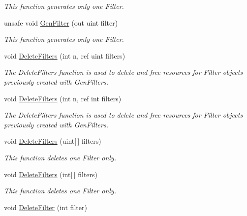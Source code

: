 \begin{DoxyCompactItemize}
\begin{DoxyCompactList}\small\item\em This function generates only one Filter.\end{DoxyCompactList}\item 
unsafe void \hyperlink{class_open_t_k_1_1_audio_1_1_open_a_l_1_1_effects_extension_a82b70f934c938398c417419b9982fe7b}{Gen\-Filter} (out uint filter)
\begin{DoxyCompactList}\small\item\em This function generates only one Filter.\end{DoxyCompactList}\item 
void \hyperlink{class_open_t_k_1_1_audio_1_1_open_a_l_1_1_effects_extension_ad4e48a24fe5c4f31895114bb04dd5d0b}{Delete\-Filters} (int n, ref uint filters)
\begin{DoxyCompactList}\small\item\em The Delete\-Filters function is used to delete and free resources for Filter objects previously created with Gen\-Filters.\end{DoxyCompactList}\item 
void \hyperlink{class_open_t_k_1_1_audio_1_1_open_a_l_1_1_effects_extension_a24505350970276bc214dfc089ca6b7d3}{Delete\-Filters} (int n, ref int filters)
\begin{DoxyCompactList}\small\item\em The Delete\-Filters function is used to delete and free resources for Filter objects previously created with Gen\-Filters.\end{DoxyCompactList}\item 
void \hyperlink{class_open_t_k_1_1_audio_1_1_open_a_l_1_1_effects_extension_a60a4a879c356dab286f6325dc2084729}{Delete\-Filters} (uint\mbox{[}$\,$\mbox{]} filters)
\begin{DoxyCompactList}\small\item\em This function deletes one Filter only.\end{DoxyCompactList}\item 
void \hyperlink{class_open_t_k_1_1_audio_1_1_open_a_l_1_1_effects_extension_a6e64ebb2c6fd75b4acfde4653ea9528b}{Delete\-Filters} (int\mbox{[}$\,$\mbox{]} filters)
\begin{DoxyCompactList}\small\item\em This function deletes one Filter only.\end{DoxyCompactList}\item 
void \hyperlink{class_open_t_k_1_1_audio_1_1_open_a_l_1_1_effects_extension_afcbbe986b53d7b60fe2c7815dd0d1797}{Delete\-Filter} (int filter)

\end{DoxyCompactItemize}
